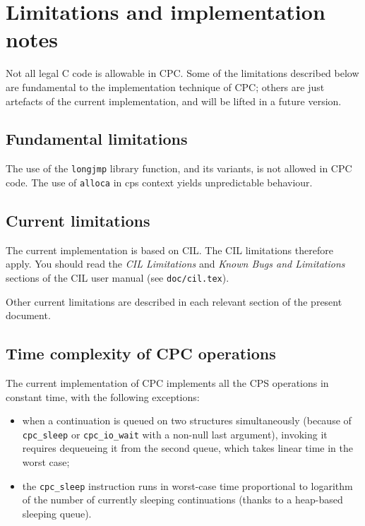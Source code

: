 \documentclass[a4paper]{report}
\begin{document}
\section{Limitations and implementation notes}

Not all legal C code is allowable in CPC.  Some of the limitations
described below are fundamental to the implementation technique of
CPC; others are just artefacts of the current implementation, and will
be lifted in a future version.

\subsection{Fundamental limitations}

The use of the {\tt longjmp} library function, and its variants, is
not allowed in CPC code.  The use of \texttt{alloca} in cps context
yields unpredictable behaviour.

\subsection{Current limitations}

The current implementation is based on CIL.  The CIL limitations
therefore apply.  You should read the \textit{CIL Limitations} and
\textit{Known Bugs and Limitations} sections of the CIL user manual
(see \texttt{doc/cil.tex}).

Other current limitations are described in each relevant section of the
present document.

\subsection{Time complexity of CPC operations}

The current implementation of CPC implements all the CPS operations in
constant time, with the following exceptions:
\begin{itemize} 
\item when a continuation is queued on two structures simultaneously
  (because of {\tt cpc\_sleep} or {\tt cpc\_io\_wait} with a non-null
  last argument), invoking it requires dequeueing it from the second
  queue, which takes linear time in the worst case;
\item the {\tt cpc\_sleep} instruction runs in worst-case time
  proportional to logarithm of the number of currently sleeping
  continuations (thanks to a heap-based sleeping queue).
\end{itemize}
\end{document}
